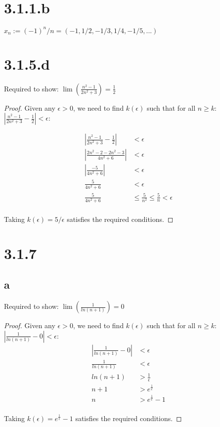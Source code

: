 \documentclass{article}
\begin{document}
\section*{3.1.1.b}

$x_n := (-1)^n/n = (-1, 1/2, -1/3, 1/4, -1/5, ...)$

\section*{3.1.5.d}
Required to show: $\lim (\frac{n^2 - 1}{2n^2 + 3}) = \frac{1}{2}$

\begin{proof}
  Given any $\epsilon > 0$, we need to find $k(\epsilon)$ such that for all $n \geq k$: $|\frac{n^2 - 1}{2n^2 + 3} - \frac{1}{2}| < \epsilon$:

   \begin{align*}
    |\frac{n^2 - 1}{2n^2 + 3} - \frac{1}{2}| &< \epsilon \\
    |\frac{2n^2 - 2 - 2n^2 - 3}{4n^2 + 6}| &< \epsilon \\
    |\frac{-5}{4n^2 + 6}| &< \epsilon \\
    \frac{5}{4n^2 + 6} &< \epsilon \\
    \frac{5}{4n^2 + 6} &\leq \frac{5}{n^2} \leq \frac{5}{n} < \epsilon \\
  \end{align*}

  \noindent
  Taking $k(\epsilon)=5/\epsilon$ satisfies the required conditions.

\end{proof}

\section*{3.1.7}

\subsection*{a}
Required to show: $\lim (\frac{1}{ln(n+1)}) = 0$
\begin{proof}
  Given any $\epsilon > 0$, we need to find $k(\epsilon)$ such that for all $n \geq k$: $|\frac{1}{ln(n+1)} - 0| < \epsilon$:
  \begin{align*}
    |\frac{1}{ln(n+1)} - 0| &< \epsilon \\
    \frac{1}{ln(n+1)} &< \epsilon \\
    ln(n+1) &> \frac{1}{\epsilon} \\
    n+1 &> e^\frac{1}{\epsilon} \\
    n &>  e^\frac{1}{\epsilon} - 1 \\
  \end{align*}

  Taking $k(\epsilon)= e^\frac{1}{\epsilon} - 1$ satisfies the required conditions.

\end{proof}
\end{document}
